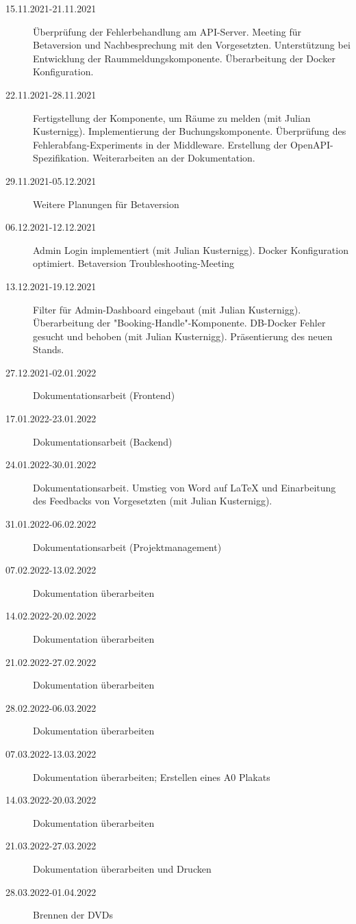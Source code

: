 \begin{description}
    \item[15.11.2021-21.11.2021] Überprüfung der Fehlerbehandlung am API-Server. Meeting für Betaversion und Nachbesprechung mit den Vorgesetzten. Unterstützung bei Entwicklung der Raummeldungskomponente. Überarbeitung der Docker Konfiguration.
    \item[22.11.2021-28.11.2021] Fertigstellung der Komponente, um Räume zu melden (mit Julian Kusternigg). Implementierung der Buchungskomponente. Überprüfung des Fehlerabfang-Experiments in der Middleware.
    Erstellung der OpenAPI-Spezi\-fikation. Weiterarbeiten an der Dokumentation.
    \item[29.11.2021-05.12.2021] Weitere Planungen für Betaversion
    \item[06.12.2021-12.12.2021] Admin Login implementiert (mit Julian Kusternigg). Docker Konfiguration optimiert. Betaversion Troubleshooting-Meeting
    \item[13.12.2021-19.12.2021] Filter für Admin-Dashboard eingebaut (mit Julian Kusternigg). Überarbeitung der "Booking-Handle"-Komponente. DB-Docker Fehler gesucht und behoben (mit Julian Kusternigg). Präsentierung des neuen Stands.
    \item[27.12.2021-02.01.2022] Dokumentationsarbeit (Frontend)
    \item[17.01.2022-23.01.2022] Dokumentationsarbeit (Backend)
    \item[24.01.2022-30.01.2022] Dokumentationsarbeit. Umstieg von Word auf LaTeX und Einarbeitung des Feedbacks von Vorgesetzten (mit Julian Kusternigg). 
    \item[31.01.2022-06.02.2022] Dokumentationsarbeit (Projektmanagement)
    \item[07.02.2022-13.02.2022] Dokumentation überarbeiten
    \item[14.02.2022-20.02.2022] Dokumentation überarbeiten 
    \item[21.02.2022-27.02.2022] Dokumentation überarbeiten
    \item[28.02.2022-06.03.2022] Dokumentation überarbeiten
    \item[07.03.2022-13.03.2022] Dokumentation überarbeiten; Erstellen eines A0 Plakats
    \item[14.03.2022-20.03.2022] Dokumentation überarbeiten
    \item[21.03.2022-27.03.2022] Dokumentation überarbeiten und Drucken
    \item[28.03.2022-01.04.2022] Brennen der DVDs
\end{description}
